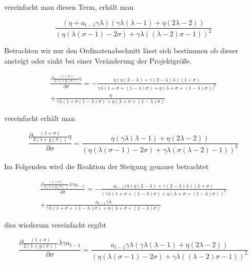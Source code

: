 vereinfacht man diesen Term, erhält man


\begin{equation}
\frac{(\eta+a_{t-1}\gamma\lambda)(\gamma\lambda(\lambda-1)+\eta(2\lambda-2))}{(\eta(\lambda(\sigma-1)-2\sigma)+\gamma\lambda((\lambda-2)\sigma-1))^2}
\end{equation}


Betrachten wir nur den Ordinatenabschnitt lässt sich bestimmen ob dieser ansteigt oder sinkt bei einer Veränderung der Projektgrö{\ss}e. 


\begin{equation}
\begin{split}
\frac{\partial{\frac{(1+\sigma)}{2(1+g(\sigma))}\eta}}{\partial\sigma}=-\frac{\eta(\eta(2-\lambda)+\gamma(2-\lambda)\lambda)(1+\sigma)}{\gamma\lambda(1+\sigma+(1-\lambda)\sigma)+\eta(\lambda+\sigma+(1-\lambda)\sigma))^2}\\
+\frac{\eta}{\gamma\lambda(1+\sigma(1-\lambda)\sigma)+\eta(\lambda+\sigma+(1-\lambda)\sigma)}
\end{split}
\end{equation}


vereinfacht erhält man


\begin{equation}
\frac{\partial{\frac{(1+\sigma)}{2(1+g(\sigma))}\eta}}{\partial{\sigma}}=\frac{\eta(\gamma\lambda(\lambda-1)+\eta(2\lambda-2))}{(\eta(\lambda(\sigma-1)-2\sigma)+\gamma\lambda(\sigma(\lambda-2)-1))^2}
\end{equation}


Im Folgenden wird die Reaktion der Steigung genauer betrachtet 


\begin{equation}
\begin{split}
\frac{\partial{\frac{(1+\sigma)}{2(1+g(\sigma))}\lambda\gamma a_{t-1}}}{\partial\sigma}=-\frac{a_{t-1}\gamma\lambda(\eta(2-\lambda)+\gamma(2-\lambda)\lambda)(1+\sigma)}{(\gamma\lambda(1+\sigma+(1-\lambda)\sigma)+\eta(\lambda+\sigma+(1-\lambda)\sigma))^2}\\
+\frac{a_{t-1}\gamma\lambda}{\gamma\lambda(1+\sigma+(1-\lambda)\sigma)+\eta(\lambda+\sigma+(1-\lambda)\sigma)}
\end{split}
\end{equation}


dies wiederum vereinfacht ergibt


\begin{equation}
\frac{\partial{\frac{(1+\sigma)}{2(1+g(\sigma))}\lambda\gamma a_{t-1}}}{\partial\sigma}=\frac{a_{t-1}\gamma\lambda(\gamma\lambda(\lambda-1)+\eta(2\lambda-2))}{(\eta(\lambda(\sigma-1)-2\sigma)+\gamma\lambda((\lambda-2)\sigma-1))^2}
\end{equation}


